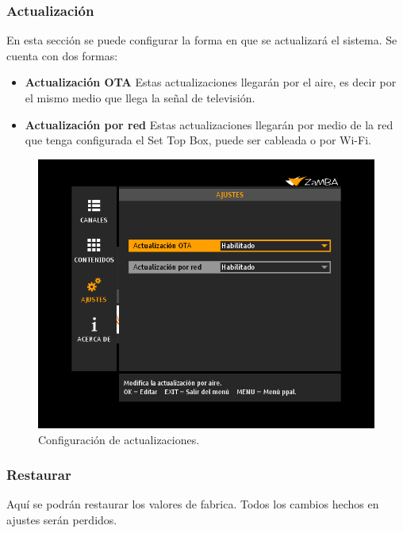 \documentclass{article}
\begin{document}
\subsubsection{Actualización}
	En esta sección se puede configurar la forma en que se actualizará el sistema. Se cuenta con dos formas:
	\begin{itemize}
		\item \textbf{Actualización OTA} Estas actualizaciones llegarán por el aire, es decir por el mismo medio que llega la señal de televisión.
		\item \textbf{Actualización por red} Estas actualizaciones llegarán por medio de la red que tenga configurada el Set Top Box, puede ser cableada o por Wi-Fi.
	\end{itemize}
	
	\begin{figure}[h]
		\centerline{\includegraphics[scale=0.50,keepaspectratio=true]{ajustes_actualizacion}}
 		\caption{Configuración de actualizaciones.}
	\end{figure}

\subsubsection{Restaurar}
	Aquí se podrán restaurar los valores de fabrica. Todos los cambios hechos en ajustes serán perdidos.
	
\end{document}
